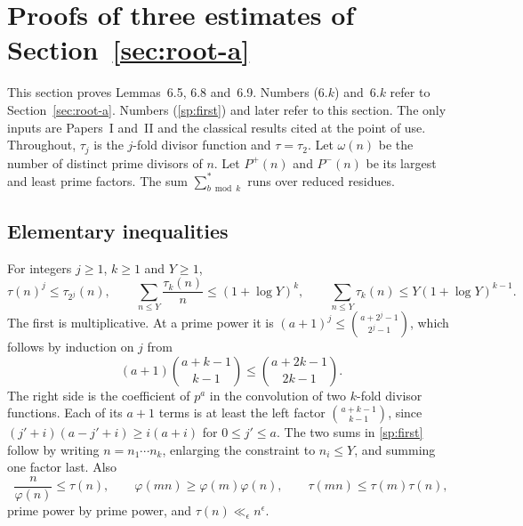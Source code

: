 \providecommand{\Li}{\operatorname{Li}}
\newenvironment{mainlemma}[2]%
  {\par\medskip\noindent\textbf{Lemma~#1}\ (#2)\textbf{.}\ \itshape}%
  {\par\medskip}

\section{Proofs of three estimates of Section~\ref{sec:root-a}}\label{app:ra-proofs}

This section proves Lemmas~6.5, 6.8 and~6.9.
Numbers (6.$k$) and~6.$k$ refer to Section~\ref{sec:root-a}. Numbers (\ref{sp:first})
and later refer to this section. The only inputs are Papers~I and~II and
the classical results cited at the point of use. Throughout,
$\tau_j$ is the $j$-fold divisor function and $\tau=\tau_2$.
Let $\omega(n)$ be the number of distinct prime divisors of $n$. Let $P^+(n)$ and $P^-(n)$
be its largest and least prime factors. The sum $\sum^*_{b\bmod k}$ runs over
reduced residues.

\subsection{Elementary inequalities}

For integers $j\ge1$, $k\ge1$ and $Y\ge1$,
\begin{equation}\label{sp:first}
 \tau(n)^j\le\tau_{2^j}(n),\qquad
 \sum_{n\le Y}\frac{\tau_k(n)}n\le(1+\log Y)^k,\qquad
 \sum_{n\le Y}\tau_k(n)\le Y(1+\log Y)^{k-1}.
\end{equation}
The first is multiplicative. At a prime power it is
$(a+1)^{j}\le\binom{a+2^j-1}{2^j-1}$, which follows by induction on $j$
from
\[
 (a+1)\binom{a+k-1}{k-1}\le\binom{a+2k-1}{2k-1}.
\]
The right side is the coefficient of $p^a$ in the convolution of two
$k$-fold divisor functions. Each of its $a+1$ terms is at least the left
factor $\binom{a+k-1}{k-1}$, since $(j'+i)(a-j'+i)\ge i(a+i)$ for
$0\le j'\le a$. The two sums in \eqref{sp:first} follow by writing
$n=n_1\cdots n_k$, enlarging the constraint to $n_i\le Y$, and summing
one factor last. Also
\begin{equation}\label{sp:phi-tau}
 \frac n{\varphi(n)}\le\tau(n),\qquad
 \varphi(mn)\ge\varphi(m)\varphi(n),\qquad
 \tau(mn)\le\tau(m)\tau(n),
\end{equation}
prime power by prime power, and $\tau(n)\ll_\epsilon n^\epsilon$.

